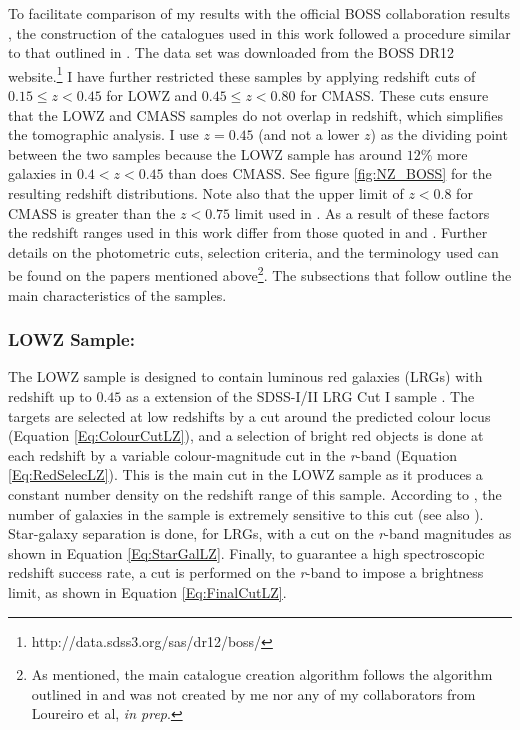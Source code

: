 To facilitate comparison of my results with the official BOSS collaboration results \citep{2016BOSSCosmology}, the construction of the catalogues used in this work followed a procedure similar to that outlined in \cite{BOSSCatalogue2016}. The data set was downloaded from the BOSS DR12 website.\footnote{http://data.sdss3.org/sas/dr12/boss/} I have further restricted these samples by applying redshift cuts of $0.15 \leq z < 0.45$ for LOWZ and $0.45 \leq z < 0.80$ for CMASS. These cuts ensure that the LOWZ and CMASS samples do not overlap in redshift, which simplifies the tomographic analysis. I use $z = 0.45$ (and not a lower $z$) as the dividing point between the two samples because the LOWZ sample has around $12\%$ more galaxies in $0.4 < z < 0.45$ than does CMASS. See figure \ref{fig:NZ_BOSS} for the resulting redshift distributions. Note also that the upper limit of $z < 0.8$ for CMASS is greater than the $z < 0.75$ limit used in \cite{BOSSCatalogue2016}. As a result of these factors the redshift ranges used in this work differ from those quoted in \cite{BOSSCatalogue2016} and \cite{2016BOSSCosmology}. Further details on the photometric cuts, selection criteria, and the terminology used can be found on the papers mentioned above\footnote{As mentioned, the main catalogue creation algorithm follows the algorithm outlined in \cite{BOSSCatalogue2016} and was not created by me nor any of my collaborators from Loureiro et al, \textit{in prep}.}. The subsections that follow outline the main characteristics of the samples.

\subsubsection{LOWZ Sample:}
The LOWZ sample is designed to contain luminous red galaxies (LRGs) with redshift up to $0.45$ as a extension of the SDSS-I/II LRG Cut I sample \citep{2001Eisenstein}. The targets are selected at low redshifts by a cut around the predicted colour locus (Equation \ref{Eq:ColourCutLZ}), and a selection of bright red objects is done at each redshift by a variable colour-magnitude cut in the \textit{r}-band (Equation \ref{Eq:RedSelecLZ}). This is the main cut in the LOWZ sample as it produces a constant number density on the redshift range of this sample. According to \cite{BOSSCatalogue2016}, the number of galaxies in the sample is extremely sensitive to this cut (see also \cite{2013ROSS}). Star-galaxy separation is done, for LRGs, with a cut on the \textit{r}-band magnitudes as shown in Equation \eqref{Eq:StarGalLZ}. Finally, to guarantee a high spectroscopic redshift success rate, a cut is performed on the \textit{r}-band to impose a brightness limit, as shown in Equation \eqref{Eq:FinalCutLZ}.

